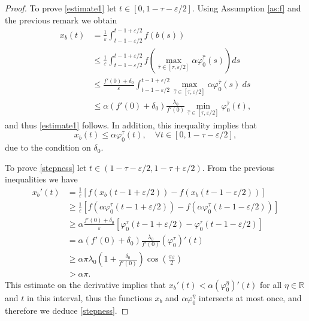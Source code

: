 \documentclass[10pt,a4paper]{amsart}
\newcommand{\R}{\mathbb{R}}
\begin{document}
\begin{proof}
To prove \eqref{estimate1} let $t\in [0,1-\tau-\varepsilon/2]$. Using Assumption \ref{as:f} and the previous remark we obtain
\begin{align*}
    x_b(t) &= \frac{1}{\varepsilon}\int_{t-1-\varepsilon/2}^{t-1+\varepsilon/2} f(b(s)) \\
    &\leq \frac{1}{\varepsilon}\int_{t-1-\varepsilon/2}^{t-1+\varepsilon/2} f\left( \max_{\hat{\tau}\in[\tau,\varepsilon/2]} \alpha \varphi_0^{\hat{\tau}} (s) \right) ds \\
    &\leq \frac{f'(0)+\delta_0}{\varepsilon}\int_{t-1-\varepsilon/2}^{t-1+\varepsilon/2} \max_{\hat{\tau}\in[\tau,\varepsilon/2]} \alpha \varphi_0^{\hat{\tau}} (s) ~ ds \\
    &\leq \alpha (f'(0) + \delta_0)\frac{\lambda_0}{f'(0)} \min_{\hat{\tau}\in[\tau,\varepsilon/2]} \varphi_0^{\hat{\tau}}(t),
\end{align*}
and thus \eqref{estimate1} follows. In addition, this inequality implies that
\begin{equation}\label{eq:inter-estimate}
    x_b(t) \leq \alpha\varphi_0^\tau(t), \quad \forall t\in[0,1-\tau-\varepsilon/2],
\end{equation}
due to the condition on $\delta_0$.

To prove \eqref{stepness} let $t\in(1-\tau-\varepsilon/2,1-\tau+\varepsilon/2)$. From the previous inequalities we have
\begin{align*}
    x_b'(t) &= \frac{1}{\varepsilon} [ f(x_b(t-1+\varepsilon/2)) - f(x_b(t-1-\varepsilon/2)) ] \\
    &\geq \frac{1}{\varepsilon} [f(\alpha\varphi_0^\tau(t-1+\varepsilon/2)) - f(\alpha\varphi_0^\tau(t-1-\varepsilon/2))] \\
    &\geq \alpha\frac{f'(0)+\delta_0}{\varepsilon} [\varphi_0^\tau(t-1+\varepsilon/2) - \varphi_0^\tau(t-1-\varepsilon/2)] \\
    &= \alpha (f'(0)+\delta_0)\frac{\lambda_0}{f'(0)} (\varphi_0^\tau)'(t) \\
    &\geq \alpha\pi\lambda_0\left( 1+\frac{\delta_0}{f'(0)} \right) \cos\left( \frac{\pi\varepsilon}{2} \right) \\
    &>\alpha\pi.
\end{align*}
This estimate on the derivative implies that $x_b'(t) < \alpha(\varphi_0^\eta)'(t)$ for all $\eta\in \R$ and $t$ in this interval, thus the functions $x_b$ and $\alpha\varphi_0^\eta$ intersects at most once, and therefore we deduce \eqref{stepness}.


\end{proof}
\end{document}
